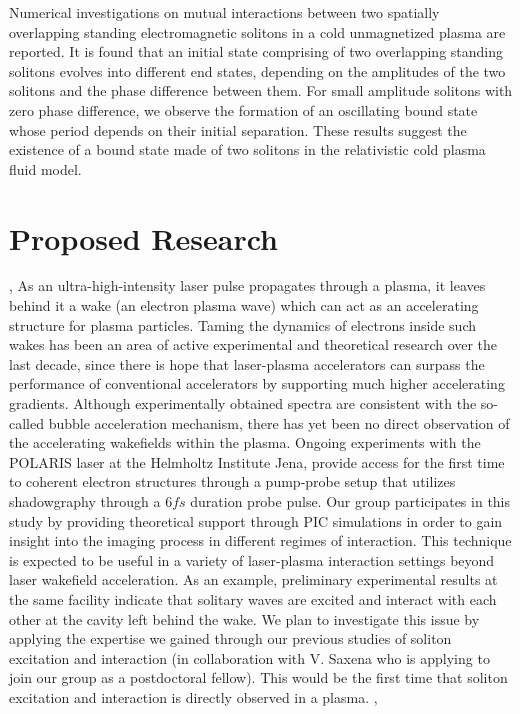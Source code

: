 \documentclass[11pt,a4paper,final]{moderncv}
\begin{document}
Numerical investigations on mutual interactions between two spatially overlapping standing electromagnetic solitons 
in a cold unmagnetized plasma are reported. It is found that an initial state comprising of two overlapping standing solitons 
evolves into different end states, depending on the amplitudes of the two solitons and the phase difference between them. 
For small amplitude solitons with zero phase difference, we observe the formation of an oscillating bound state whose 
period depends on their initial separation. These results suggest the existence of a bound state made of two solitons 
in the relativistic cold plasma fluid model.


\section{Proposed Research}
\sep
{}
As an ultra-high-intensity laser pulse propagates through a plasma, it leaves behind it a wake (an electron plasma wave) which can act as an accelerating
structure for plasma particles. Taming the dynamics of electrons inside such wakes has been an area of active experimental and theoretical research over 
the last decade, since there is hope that laser-plasma accelerators can surpass the performance of conventional accelerators by supporting 
much higher accelerating gradients. Although experimentally obtained spectra are consistent with the so-called bubble acceleration mechanism,
there has yet been no direct observation of the accelerating wakefields within the plasma. Ongoing experiments with the POLARIS laser at the
Helmholtz Institute Jena, provide access for the first time to coherent electron structures through a pump-probe setup that utilizes shadowgraphy 
through a $6fs$ duration probe pulse. Our group participates in this study by providing theoretical support through PIC simulations in order to
gain insight into the imaging process in different regimes of interaction. This technique is expected to be useful in a variety of 
laser-plasma interaction settings beyond laser wakefield acceleration. As an example, preliminary experimental results at the same facility indicate that solitary waves 
are excited and interact with each other at the cavity left behind the wake. We plan to investigate this issue by applying the expertise we gained through
our previous studies of soliton excitation and interaction (in collaboration with V. Saxena who is applying to join our group as a postdoctoral fellow).
This would be the first time that soliton excitation and interaction is directly observed in a plasma.
\sep
\end{document}
